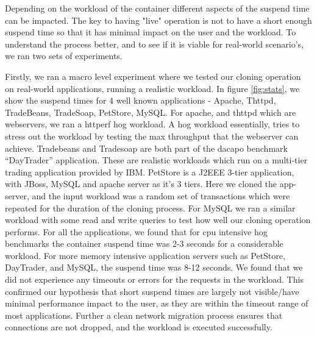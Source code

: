 Depending on the workload of the container different aspects of the suspend time can be impacted.
The key to having "live" operation is not to have a short enough suspend time so that it has minimal impact on the user and the workload.
To understand the process better, and to see if it is viable for real-world scenario's, we ran two sets of experiments.

Firstly, we ran a macro level experiment where we tested our cloning operation on real-world applications, running a realistic workload.
In figure \ref{fig:stats}, we show the suspend times for 4 well known applications - Apache, Thttpd, TradeBeans, TradeSoap, PetStore, MySQL. 
For apache, and thttpd which are webservers, we ran a httperf hog workload. A hog workload essentially, tries to stress out the workload by testing the max throughput that the webserver can achieve.
Tradebeans and Tradesoap are both part of the dacapo\cite{dacapo} benchmark ``DayTrader'' application.
These are realistic workloads which run on a multi-tier trading application provided by IBM. 
PetStore is a J2EEE 3-tier application, with JBoss, MySQL and apache server as it's 3 tiers.
Here we cloned the app-server, and the input workload was a random set of transactions which were repeated for the duration of the cloning process.
For MySQL we ran a similar workload with some read and write queries to test how well our cloning operation performs.
For all the applications, we found that for cpu intensive hog benchmarks the container suspend time was 2-3 seconds for a considerable workload.
For more memory intensive application servers such as PetStore, DayTrader, and MySQL, the suspend time was 8-12 seconds.
We found that we did not experience any timeouts or errors for the requests in the workload. 
This confirmed our hypothesis that short suspend times are largely not visible/have minimal performance impact to the user, as they are within the timeout range of most applications.
Further a clean network migration process ensures that connections are not dropped, and the workload is executed successfully.

